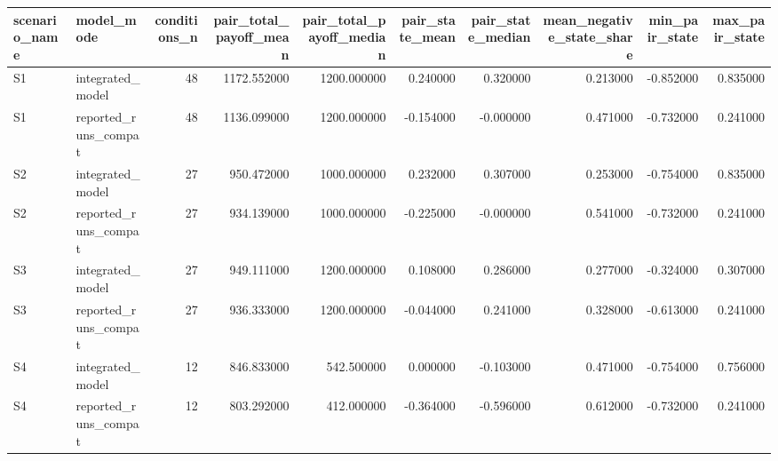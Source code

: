 \begin{tabular}{llrrrrrrrr}
\toprule
scenario\_name & model\_mode & conditions\_n & pair\_total\_payoff\_mean & pair\_total\_payoff\_median & pair\_state\_mean & pair\_state\_median & mean\_negative\_state\_share & min\_pair\_state & max\_pair\_state \\
\midrule
S1 & integrated\_model & 48 & 1172.552000 & 1200.000000 & 0.240000 & 0.320000 & 0.213000 & -0.852000 & 0.835000 \\
S1 & reported\_runs\_compat & 48 & 1136.099000 & 1200.000000 & -0.154000 & -0.000000 & 0.471000 & -0.732000 & 0.241000 \\
S2 & integrated\_model & 27 & 950.472000 & 1000.000000 & 0.232000 & 0.307000 & 0.253000 & -0.754000 & 0.835000 \\
S2 & reported\_runs\_compat & 27 & 934.139000 & 1000.000000 & -0.225000 & -0.000000 & 0.541000 & -0.732000 & 0.241000 \\
S3 & integrated\_model & 27 & 949.111000 & 1200.000000 & 0.108000 & 0.286000 & 0.277000 & -0.324000 & 0.307000 \\
S3 & reported\_runs\_compat & 27 & 936.333000 & 1200.000000 & -0.044000 & 0.241000 & 0.328000 & -0.613000 & 0.241000 \\
S4 & integrated\_model & 12 & 846.833000 & 542.500000 & 0.000000 & -0.103000 & 0.471000 & -0.754000 & 0.756000 \\
S4 & reported\_runs\_compat & 12 & 803.292000 & 412.000000 & -0.364000 & -0.596000 & 0.612000 & -0.732000 & 0.241000 \\
\bottomrule
\end{tabular}
